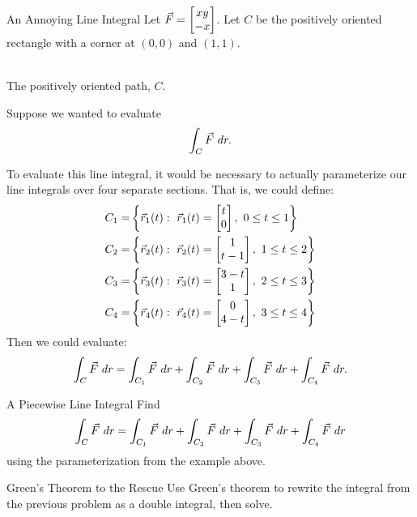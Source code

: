 \begin{example}{An Annoying Line Integral}
Let $\vec{F}=\begin{bmatrix}xy\\-x\end{bmatrix}$. Let $C$ be the positively oriented rectangle with a corner at $(0,0)$ and $(1,1)$.

\begin{center}
\\
The positively oriented path, $C$.
\end{center}

Suppose we wanted to evaluate $$\int_C \vec{F} \ dr. $$ 

To evaluate this line integral, it would be necessary to actually parameterize our line integrals over four separate sections. That is, we could define:
\begin{align*}
C_1=&\left\{\vec{r}_1(t):\ \vec{r}_1(t)=\begin{bmatrix}t\\0\end{bmatrix}, \ 0\leq t\leq 1 \right\}\\
C_2=&\left\{\vec{r}_2(t):\ \vec{r}_2(t)=\begin{bmatrix}1\\t-1\end{bmatrix}, \ 1\leq t\leq 2 \right\}\\
C_3=&\left\{\vec{r}_3(t):\ \vec{r}_3(t)=\begin{bmatrix}3-t\\1\end{bmatrix}, \ 2\leq t\leq 3 \right\}\\
C_4=&\left\{\vec{r}_4(t):\ \vec{r}_4(t)=\begin{bmatrix}0\\4-t\end{bmatrix}, \ 3\leq t\leq 4 \right\}
\end{align*}
Then we could evaluate:
$$\int_C \vec{F} \ dr=\int_{C_1} \vec{F} \ dr+\int_{C_2} \vec{F} \ dr+\int_{C_3} \vec{F} \ dr+\int_{C_4} \vec{F} \ dr.$$
\end{example}

\begin{exercise}{A Piecewise Line Integral}
Find $$\int_C \vec{F} \ dr=\int_{C_1} \vec{F} \ dr+\int_{C_2} \vec{F} \ dr+\int_{C_3} \vec{F} \ dr+\int_{C_4} \vec{F} \ dr$$ using the parameterization from the example above.
\end{exercise}

\begin{exercise}{Green's Theorem to the Rescue}
Use Green's theorem to rewrite the integral from the previous problem as a double integral, then solve.
\end{exercise}

